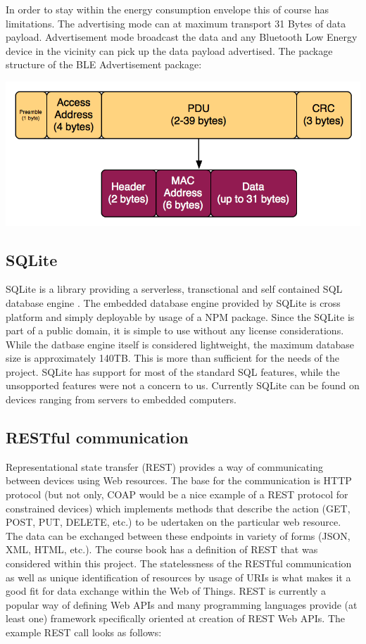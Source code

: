 \bigskip

In order to stay within the energy consumption envelope this of course has limitations. The advertising mode can at maximum transport 31 Bytes of data payload. Advertisement mode broadcast the data and any Bluetooth Low Energy device in the vicinity can pick up the data payload advertised. The package structure of the BLE Advertisement package:

\bigskip
\includegraphics[scale=0.4]{gfx/blepacket} 
\bigskip  

\subsection{SQLite}
\label{subsec:sqlite}
SQLite is a library providing a serverless, transctional and self contained SQL database engine \citep{sqlite}. The embedded database engine provided by SQLite is cross platform and simply deployable by usage of a NPM package. Since the SQLite is part of a public domain, it is simple to use without any license considerations. While the datbase engine itself is considered lightweight, the maximum database size is approximately 140TB. This is more than sufficient for the needs of the project. SQLite has support for most of the standard SQL features, while the unsopported features were not a concern to us. Currently SQLite can be found on devices ranging from servers to embedded computers.

\subsection{RESTful communication}
\label{subsec:rest}
Representational state transfer (REST) provides a way of communicating between devices using Web resources. The base for the communication is HTTP protocol (but not only, COAP would be a nice example of a REST protocol for constrained devices) which implements methods that describe the action (GET, POST, PUT, DELETE, etc.) to be udertaken on the particular web resource. The data can be exchanged between these endpoints in variety of forms (JSON, XML, HTML, etc.). The course book \citep{Guinard:2016:BWT:3055920} has a definition of REST that was considered within this project. The statelessness of the RESTful communication as well as unique identification of resources by usage of URIs is what makes it a good fit for data exchange within the Web of Things. REST is currently a popular way of defining Web APIs and many programming languages provide (at least one) framework specifically oriented at creation of REST Web APIs. The example REST call looks as follows:

